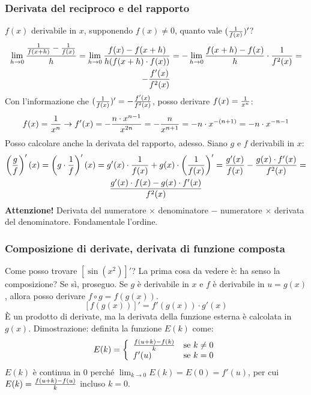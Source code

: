 \documentclass[12pt,a4paper]{article}
\begin{document}
\subsubsection{Derivata del reciproco e del rapporto}
$f(x)$ derivabile in $x$, supponendo $f(x) \neq 0$,
quanto vale $ ( {1 \over f(x)} )' $?
\begin{multline}
\lim \limits_{h \to 0} { {1 \over f(x+h)} - {1 \over f(x)}  \over h} = 
\lim \limits_{h \to 0} { f(x) - f(x+h)  \over h (f(x+h) \cdot f(x))} = 
- \lim \limits_{h \to 0} { f(x+h) - f(x) \over h} \cdot 
{1 \over f^2(x)} = \\ -{f'(x) \over f^2(x)}
\end{multline}
Con l'informazione che $({1 \over f(x)})' = - {f'(x) \over f^2(x)}$,
posso derivare $f(x) = {1 \over x^n}$:
\begin{multline}
f(x) = {1 \over x^n} \to f'(x) = - {n \cdot x^{n-1} \over x^{2n}} =
- {n \over x^{n+1}} = - n \cdot x^{-(n+1)} = - n \cdot x^{-n - 1}
\end{multline}
Posso calcolare anche la derivata del rapporto, adesso. 
Siano $g$ e $f$ derivabili in $x$:
\begin{multline}
\left({g \over f} \right)'(x) = \left(g \cdot {1 \over f} \right)'(x) =
g'(x) \cdot {1 \over f(x)} + g(x) \cdot \left({1 \over f(x)} \right)' =
{g'(x) \over f(x)} - {g(x) \cdot f'(x) \over f^2(x)} = \\
{g'(x) \cdot f(x) - g(x) \cdot f'(x) \over f^2(x)}	
\end{multline}
\textbf{Attenzione!} Derivata del numeratore $\times$ denominatore $-$
numeratore $\times$ derivata del denominatore. Fondamentale l'ordine.

\subsubsection{Composizione di derivate, derivata di funzione composta}
Come posso trovare $ \left[ \sin(x^2) \right]'$?
La prima cosa da vedere \`e: ha senso la composizione? Se s\`i, proseguo.
Se $g$ \`e derivabile in $x$ e $f$ \`e derivabile in $u = g(x)$, allora
posso derivare $f \circ g = f(g(x))$.
\[
\left[ f \left( g(x) \right) \right]' = f'(g(x)) \cdot g'(x)
\]
\`E un prodotto di derivate, ma la derivata della funzione esterna
\`e calcolata in $g(x)$. Dimostrazione: definita la funzione
$E(k)$ come:
\[
E(k) = \left\{ \begin{array}{lr}
{f(u+k) - f(k) \over k} & \text{se } k \neq 0\\
f'(u) & \text{se } k = 0
\end{array} \right.
\]
$E(k)$ \`e continua in $0$ perch\'e $ \lim_{k \to 0} E(k) = E(0) = f'(u) $,
per cui $E(k) = { f(u+k) - f(u) \over k }$ incluso $k = 0$.
\end{document}
